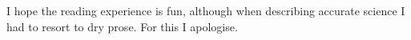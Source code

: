 I hope the reading experience is fun, although when describing accurate science I had to resort to dry prose. For this I apologise.



